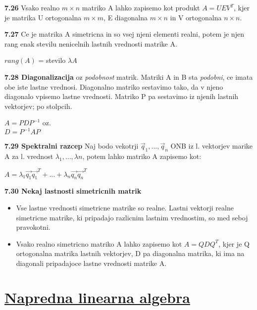 \documentclass{article}
\begin{document}
\begin{multicols}{2}
	\textbf{7.26} Vsako realno $m \times n$ matriko A lahko zapisemo kot produkt
	$A = UEV^{T}$, kjer je matrika U ortogonalna $m \times m$, E diagonalna $m \times n$ in
	V ortogonalna $n \times n$.

	\textbf{7.27} Ce je  matrika A simetricna in so vsej njeni elementi realni, potem je njen rang enak stevilu nenicelnih lastnih
	vrednosti matrike A.
	\begin{center}
		$rang(A)$ = stevilo $\lambda A$
	\end{center}

	\textbf{7.28 Diagonalizacija} oz \textit{podobnost} matrik. Matriki A in B sta \textit{podobni}, ce imata
	obe iste lastne vrednosi. Diagonalno matriko sestavimo tako, da v njeno diagonalo vpisemo lastne vrednosti. Matriko
	P pa sestavimo iz njenih lastnih vektorjev; po stolpcih.
	\begin{center}
		\begin{math}
			A = PDP^{-1}
		\end{math} oz.\\
		\begin{math}
			D = P^{-1}AP
		\end{math}
	\end{center}

	\textbf{7.29 Spektralni razcep}
	Naj bodo vekotrji $\vec{q}_{1}, \dots, \vec{q}_{n}$ ONB iz l. vektorjev marike A za l. vrednost $\lambda_{1}, \dots, \lambda{n}$,
	potem lahko matriko A zapisemo kot:
	\begin{center}
		\begin{math}
			A = \lambda_{1} \vec{q_{1}} \vec{q_{1}}^{T} + \dots + \lambda_{n} \vec{q_{n}} \vec{q_{n}}^{T}
		\end{math}
	\end{center}

	\textbf{7.30 Nekaj lastnosti simetricnih matrik}
	\begin{itemize}
		\item Vse lastne vrednosti simetricne matrike so realne. Lastni vektorji realne simetricne matrike, ki
		      pripadajo razlicnim lastnim vrednostim, so med seboj pravokotni.
		\item Vsako realno simetricno matriko A lahko zapisemo kot $A = QDQ^{T}$, kjer je Q ortogonalna matrika lastnih vektorjev, D pa diagonalna matrika,
		      ki ima na diagonali pripadajoce lastne vrednosti matrike A.
	\end{itemize}

	\section{\underline{Napredna linearna algebra}}


\end{multicols}
\end{document}
